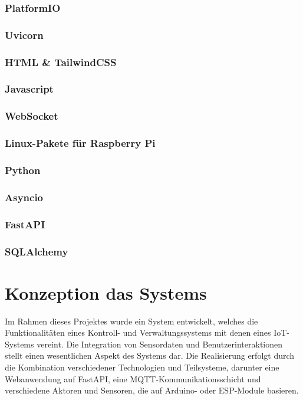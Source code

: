 \documentclass[12pt, letterpaper]{article}
\begin{document}
  \subsubsection{PlatformIO}

    \subsubsection{Uvicorn}
    \subsubsection{HTML \& TailwindCSS}
    \subsubsection{Javascript}
    \subsubsection{WebSocket}
    \subsubsection{Linux-Pakete für Raspberry Pi}
    \subsubsection{Python}
    \subsubsection{Asyncio}
    \subsubsection{FastAPI}
    \subsubsection{SQLAlchemy}

\newpage
\section{Konzeption das Systems}
\par Im Rahmen dieses Projektes wurde ein System entwickelt, welches die Funktionalitäten eines Kontroll- und Verwaltungssystems mit denen eines IoT-Systems vereint. Die Integration von Sensordaten und Benutzerinteraktionen stellt einen wesentlichen Aspekt des Systems dar. Die Realisierung erfolgt durch die Kombination verschiedener Technologien und Teilsysteme, darunter eine Webanwendung auf FastAPI, eine MQTT-Kommunikationsschicht und verschiedene Aktoren und Sensoren, die auf Arduino- oder ESP-Module basieren.
\end{document}
